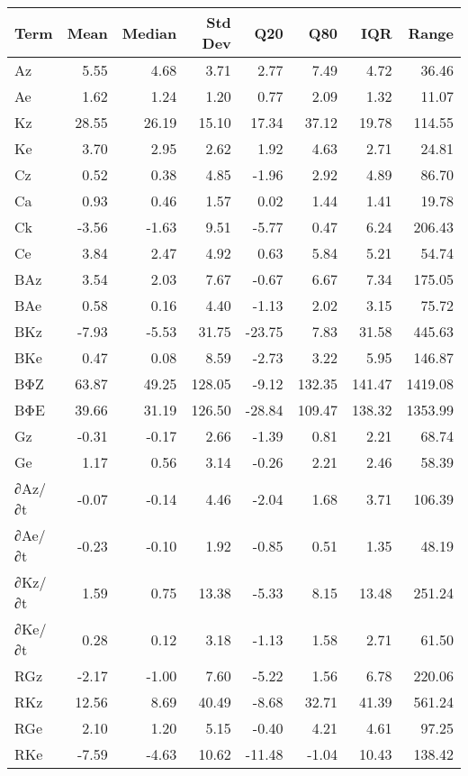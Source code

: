 \begin{tabular}{lrrrrrrr}
\toprule
Term & Mean & Median & Std Dev & Q20 & Q80 & IQR & Range \\
\midrule
Az & 5.55 & 4.68 & 3.71 & 2.77 & 7.49 & 4.72 & 36.46 \\
Ae & 1.62 & 1.24 & 1.20 & 0.77 & 2.09 & 1.32 & 11.07 \\
Kz & 28.55 & 26.19 & 15.10 & 17.34 & 37.12 & 19.78 & 114.55 \\
Ke & 3.70 & 2.95 & 2.62 & 1.92 & 4.63 & 2.71 & 24.81 \\
Cz & 0.52 & 0.38 & 4.85 & -1.96 & 2.92 & 4.89 & 86.70 \\
Ca & 0.93 & 0.46 & 1.57 & 0.02 & 1.44 & 1.41 & 19.78 \\
Ck & -3.56 & -1.63 & 9.51 & -5.77 & 0.47 & 6.24 & 206.43 \\
Ce & 3.84 & 2.47 & 4.92 & 0.63 & 5.84 & 5.21 & 54.74 \\
BAz & 3.54 & 2.03 & 7.67 & -0.67 & 6.67 & 7.34 & 175.05 \\
BAe & 0.58 & 0.16 & 4.40 & -1.13 & 2.02 & 3.15 & 75.72 \\
BKz & -7.93 & -5.53 & 31.75 & -23.75 & 7.83 & 31.58 & 445.63 \\
BKe & 0.47 & 0.08 & 8.59 & -2.73 & 3.22 & 5.95 & 146.87 \\
BΦZ & 63.87 & 49.25 & 128.05 & -9.12 & 132.35 & 141.47 & 1419.08 \\
BΦE & 39.66 & 31.19 & 126.50 & -28.84 & 109.47 & 138.32 & 1353.99 \\
Gz & -0.31 & -0.17 & 2.66 & -1.39 & 0.81 & 2.21 & 68.74 \\
Ge & 1.17 & 0.56 & 3.14 & -0.26 & 2.21 & 2.46 & 58.39 \\
∂Az/∂t & -0.07 & -0.14 & 4.46 & -2.04 & 1.68 & 3.71 & 106.39 \\
∂Ae/∂t & -0.23 & -0.10 & 1.92 & -0.85 & 0.51 & 1.35 & 48.19 \\
∂Kz/∂t & 1.59 & 0.75 & 13.38 & -5.33 & 8.15 & 13.48 & 251.24 \\
∂Ke/∂t & 0.28 & 0.12 & 3.18 & -1.13 & 1.58 & 2.71 & 61.50 \\
RGz & -2.17 & -1.00 & 7.60 & -5.22 & 1.56 & 6.78 & 220.06 \\
RKz & 12.56 & 8.69 & 40.49 & -8.68 & 32.71 & 41.39 & 561.24 \\
RGe & 2.10 & 1.20 & 5.15 & -0.40 & 4.21 & 4.61 & 97.25 \\
RKe & -7.59 & -4.63 & 10.62 & -11.48 & -1.04 & 10.43 & 138.42 \\
\bottomrule
\end{tabular}

